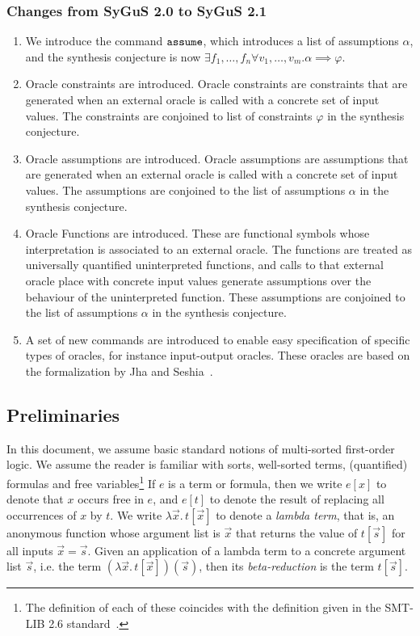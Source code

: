 \documentclass[english,a4paper,10pt]{article}
\begin{document}
\subsubsection{Changes from SyGuS 2.0 to SyGuS 2.1}
\begin{enumerate}
\item We introduce the command ${\tt assume}$, which introduces a list of assumptions $\alpha$, and the 
synthesis conjecture is now 
$\exists f_1, \ldots, f_n \forall v_1, \ldots,
v_m. \alpha \implies \varphi$. 
\item Oracle constraints are introduced. Oracle constraints are constraints that are generated when an external oracle is called with a concrete set of input values. The constraints are conjoined to list of constraints $\varphi$ in the synthesis conjecture. 

\item Oracle assumptions are introduced. Oracle assumptions are assumptions that are generated when an external oracle is called with a concrete set of input values. The assumptions are conjoined to the list of assumptions $\alpha$ in the synthesis conjecture.

\item Oracle Functions are introduced. These are functional symbols whose interpretation is associated to an external oracle. The functions are treated as universally quantified uninterpreted functions, and calls to that external oracle place with concrete input values generate assumptions over the behaviour of the uninterpreted function. These assumptions are conjoined to the list of assumptions $\alpha$ in the synthesis conjecture.

\item A set of new commands are introduced to enable easy specification of specific types of oracles, for instance input-output oracles. These oracles are based on the formalization by Jha and Seshia~\cite{oracles}.
\end{enumerate}


\subsection{Preliminaries}
In this document, we assume basic standard notions of
multi-sorted first-order logic.
We assume the reader is familiar
with sorts, well-sorted terms, (quantified) formulas
and free variables\footnote{
The definition of each of these coincides with
the definition given in the SMT-LIB 2.6 standard~\cite{BarFT-RR-17}.
}
If $e$ is a term or formula,
then we write $e[x]$ to denote that $x$ occurs free in $e$,
and $e[t]$ to denote the result of replacing all occurrences of $x$ by $t$.
We write $\lambda \vec{x}.\, t[\vec{x}]$ to denote a \emph{lambda term},
that is, an anonymous function whose argument list is $\vec{x}$
that returns the value of $t[\vec{s}]$ for all inputs $\vec{x} = \vec{s}$.
Given an application of a lambda term to a concrete argument list $\vec{s}$,
i.e. the term $(\lambda \vec{x}.\, t[\vec{x}])( \vec{s} )$,
then its \emph{beta-reduction} is the term $t[\vec{s}]$.
\end{document}
